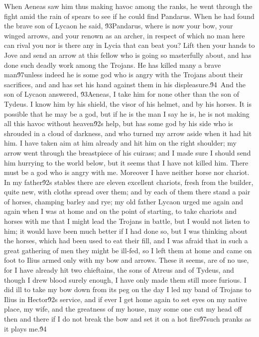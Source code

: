 {When Aeneas saw him thus making havoc among the ranks, he went through the fight amid the rain of spears to see if he could find Pandarus. When he had found the brave son of Lycaon he said, \'93Pandarus, where is now your bow, your winged arrows, and your renown as an archer, in respect of which no man here can rival you nor is there any in Lycia that can beat you? Lift then your hands to Jove and send an arrow at this fellow who is going so masterfully about, and has done such deadly work among the Trojans. He has killed many a brave man\'97unless indeed he is some god who is angry with the Trojans about their sacrifices, and and has set his hand against them in his displeasure.\'94\
And the son of Lycaon answered, \'93Aeneas, I take him for none other than the son of Tydeus. I know him by his shield, the visor of his helmet, and by his horses. It is possible that he may be a god, but if he is the man I say he is, he is not making all this havoc without heaven\'92s help, but has some god by his side who is shrouded in a cloud of darkness, and who turned my arrow aside when it had hit him. I have taken aim at him already and hit him on the right shoulder; my arrow went through the breastpiece of his cuirass; and I made sure I should send him hurrying to the world below, but it seems that I have not killed him. There must be a god who is angry with me. Moreover I have neither horse nor chariot. In my father\'92s stables there are eleven excellent chariots, fresh from the builder, quite new, with cloths spread over them; and by each of them there stand a pair of horses, champing barley and rye; my old father Lycaon urged me again and again when I was at home and on the point of starting, to take chariots and horses with me that I might lead the Trojans in battle, but I would not listen to him; it would have been much better if I had done so, but I was thinking about the horses, which had been used to eat their fill, and I was afraid that in such a great gathering of men they might be ill-fed, so I left them at home and came on foot to Ilius armed only with my bow and arrows. These it seems, are of no use, for I have already hit two chieftains, the sons of Atreus and of Tydeus, and though I drew blood surely enough, I have only made them still more furious. I did ill to take my bow down from its peg on the day I led my band of Trojans to Ilius in Hector\'92s service, and if ever I get home again to set eyes on my native place, my wife, and the greatness of my house, may some one cut my head off then and there if I do not break the bow and set it on a hot fire\'97such pranks as it plays me.\'94\
}
